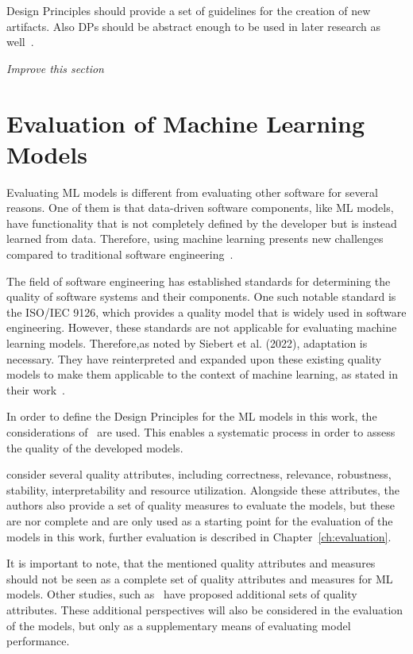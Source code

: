 Design Principles should provide a set of guidelines for the creation of new artifacts.
Also DPs should be abstract enough to be used in later research as well~\cite[p. 37]{sein2011action}.

\textit{Improve this section}


\section{Evaluation of Machine Learning Models}\label{sec:evaluation-of-machine-learning-models}
Evaluating \ac{ML} models is different from evaluating other software for several reasons.
One of them is that data-driven software components, like \ac{ML} models, have functionality that
is not completely defined by the developer but is instead learned from data.
Therefore, using machine learning presents new challenges compared to traditional software
engineering~\cite[p. 2]{siebert2022construction}.

The field of software engineering has established standards for determining the quality of software systems and their
components.
One such notable standard is the ISO/IEC 9126, which provides a quality model that is widely used in
software engineering.
However, these standards are not applicable for evaluating machine learning models.
Therefore,as noted by Siebert et al. (2022), adaptation is necessary.
They have reinterpreted and expanded upon these existing quality models to make them applicable to the context of
machine learning, as stated in their work~\cite[p. 1]{siebert2022construction}.

In order to define the Design Principles for the \ac{ML} models in this work, the
considerations of~\cite[]{siebert2022construction} are used.
This enables a systematic process in order to assess the quality of the developed models.

\cite{siebert2022construction} consider several quality attributes, including
correctness, relevance, robustness, stability, interpretability and resource utilization.
Alongside these attributes, the authors also provide a set of quality measures to evaluate the
models, but these are nor complete and are only used as a starting point for the evaluation of the
models in this work, further evaluation is described in Chapter~\ref{ch:evaluation}.

It is important to note, that the mentioned quality attributes and measures should
not be seen as a complete set of quality attributes and measures for \ac{ML} models.
Other studies, such as~\cite{zhang2020machine} have proposed additional sets of quality attributes.
These additional perspectives will also be considered in the evaluation of the models, but only
as a supplementary means of evaluating model performance.



